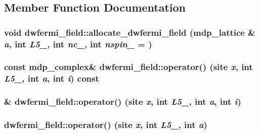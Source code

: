 \subsection{Member Function Documentation}
\hypertarget{classdwfermi__field_ab1e90f60aff705fd67fe54265511359c}{
\subsubsection[{allocate\_\-dwfermi\_\-field}]{\setlength{\rightskip}{0pt plus 5cm}void dwfermi\_\-field::allocate\_\-dwfermi\_\-field ({\bf mdp\_\-lattice} \& {\em a}, \/  int {\em L5\_\-}, \/  int {\em nc\_\-}, \/  int {\em nspin\_\-} = {})}}
\label{classdwfermi__field_ab1e90f60aff705fd67fe54265511359c}
\hypertarget{classdwfermi__field_a38dcacb8755165fdfcb41622912f1863}{
\subsubsection[{operator()}]{\setlength{\rightskip}{0pt plus 5cm}const {\bf mdp\_\-complex}\& dwfermi\_\-field::operator() (site {\em x}, \/  int {\em L5\_\-}, \/  int {\em a}, \/  int {\em i}) const}}
\label{classdwfermi__field_a38dcacb8755165fdfcb41622912f1863}
\hypertarget{classdwfermi__field_ac0d1e75f5248ce12c06e7fcb8add5948}{
\subsubsection[{operator()}]{\& dwfermi\_\-field::operator() (site {\em x}, \/  int {\em L5\_\-}, \/  int {\em a}, \/  int {\em i})}}
\label{classdwfermi__field_ac0d1e75f5248ce12c06e7fcb8add5948}
\hypertarget{classdwfermi__field_adca7e6c16994ace10946016d8d6de943}{
\subsubsection[{operator()}]{ dwfermi\_\-field::operator() (site {\em x}, \/  int {\em L5\_\-}, \/  int {\em a})}}
